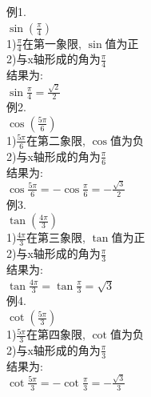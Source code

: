 例1.\\
\phantom{例1}$\displaystyle\sin(\frac{\pi}{4})$\\
1)$\frac{\pi}{4}$在第一象限, $\sin$值为正\\
2)与x轴形成的角为$\frac{\pi}{4}$\\
结果为:\\
$\displaystyle\sin\frac{\pi}{4}=\frac{\sqrt{2}}{2}$\\

例2.\\
\phantom{例2}$\displaystyle\cos(\frac{5\pi}{6})$\\
1)$\frac{5\pi}{6}$在第二象限, $\cos$值为负\\
2)与x轴形成的角为$\frac{\pi}{6}$\\
结果为:\\
$\displaystyle\cos\frac{5\pi}{6}=-\cos\frac{\pi}{6}=-\frac{\sqrt{3}}{2}$\\

例3.\\
\phantom{例3}$\displaystyle\tan(\frac{4\pi}{3})$\\
1)$\frac{4\pi}{3}$在第三象限, $\tan$值为正\\
2)与x轴形成的角为$\frac{\pi}{3}$\\
结果为:\\
$\displaystyle\tan\frac{4\pi}{3}=\tan\frac{\pi}{3}=\sqrt{3}$\\

例4.\\
\phantom{例4}$\displaystyle\cot(\frac{5\pi}{3})$\\
1)$\frac{5\pi}{3}$在第四象限, $\cot$值为负\\
2)与x轴形成的角为$\frac{\pi}{3}$\\
结果为:\\
$\displaystyle\cot\frac{5\pi}{3}=-\cot\frac{\pi}{3}=-\frac{\sqrt{3}}{3}$\\[2ex]

